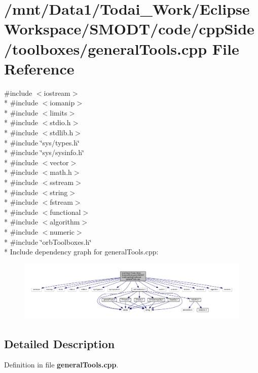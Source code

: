 \section{/mnt/\-Data1/\-Todai\-\_\-\-Work/\-Eclipse\-Workspace/\-S\-M\-O\-D\-T/code/cpp\-Side/toolboxes/general\-Tools.cpp File Reference}
\label{general_tools_8cpp}
{\ttfamily \#include $<$iostream$>$}\\*
{\ttfamily \#include $<$iomanip$>$}\\*
{\ttfamily \#include $<$limits$>$}\\*
{\ttfamily \#include $<$stdio.\-h$>$}\\*
{\ttfamily \#include $<$stdlib.\-h$>$}\\*
{\ttfamily \#include \char`\"{}sys/types.\-h\char`\"{}}\\*
{\ttfamily \#include \char`\"{}sys/sysinfo.\-h\char`\"{}}\\*
{\ttfamily \#include $<$vector$>$}\\*
{\ttfamily \#include $<$math.\-h$>$}\\*
{\ttfamily \#include $<$sstream$>$}\\*
{\ttfamily \#include $<$string$>$}\\*
{\ttfamily \#include $<$fstream$>$}\\*
{\ttfamily \#include $<$functional$>$}\\*
{\ttfamily \#include $<$algorithm$>$}\\*
{\ttfamily \#include $<$numeric$>$}\\*
{\ttfamily \#include \char`\"{}orb\-Toolboxes.\-h\char`\"{}}\\*
Include dependency graph for general\-Tools.\-cpp\-:
\nopagebreak
\begin{figure}[H]
\begin{center}
\leavevmode
\includegraphics[width=350pt]{general_tools_8cpp__incl}
\end{center}
\end{figure}


\subsection{Detailed Description}


Definition in file {\bf general\-Tools.\-cpp}.

